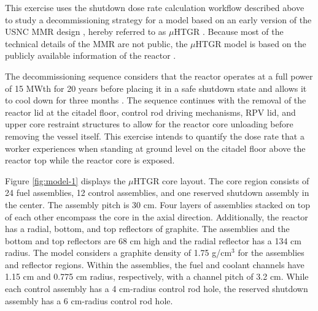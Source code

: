 


This exercise uses the shutdown dose rate calculation workflow described above to study a decommissioning strategy for a model based on an early version of the \gls*{USNC} \gls*{MMR} design \cite{uiuc-mmr2}, hereby referred to as $\mu$HTGR \cite{fairhurst_sdr_2023}.
Because most of the technical details of the MMR are not public, the $\mu$HTGR model is based on the publicly available information of the reactor \cite{uiuc-mmr2, usnc_mmr, chalk_mmr, neup_mmr}.

The decommissioning sequence considers that the reactor operates at a full power of 15 MWth for 20 years before placing it in a safe shutdown state and allows it to cool down for three months \cite{usnc_mmr}.
The sequence continues with the removal of the reactor lid at the citadel floor, control rod driving mechanisms, \gls*{RPV} lid, and upper core restraint structures to allow for the reactor core unloading before removing the vessel itself.
This exercise intends to quantify the dose rate that a worker experiences when standing at ground level on the citadel floor above the reactor top while the reactor core is exposed.

Figure \ref{fig:model-1} displays the $\mu$HTGR core layout.
The core region consists of 24 fuel assemblies, 12 control assemblies, and one reserved shutdown assembly in the center.
The assembly pitch is 30 cm.
Four layers of assemblies stacked on top of each other encompass the core in the axial direction.
Additionally, the reactor has a radial, bottom, and top reflectors of graphite.
The assemblies and the bottom and top reflectors are 68 cm high and the radial reflector has a 134 cm radius.
The model considers a graphite density of 1.75 g/cm$^3$ for the assemblies and reflector regions.
Within the assemblies, the fuel and coolant channels have 1.15 cm and 0.775 cm radius, respectively, with a channel pitch of 3.2 cm.
While each control assembly has a 4 cm-radius control rod hole, the reserved shutdown assembly has a 6 cm-radius control rod hole.

